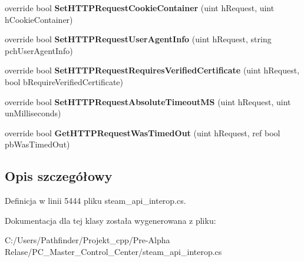 \begin{DoxyCompactItemize}
\item 
\mbox{\label{class_valve_1_1_steamworks_1_1_c_steam_h_t_t_p_a17b284d9d9ed0e9ca184bbb78473efb1}} 
override bool {\bfseries Set\+H\+T\+T\+P\+Request\+Cookie\+Container} (uint h\+Request, uint h\+Cookie\+Container)
\item 
\mbox{\label{class_valve_1_1_steamworks_1_1_c_steam_h_t_t_p_a80ea877351c612cd484a1f4849c3b6c1}} 
override bool {\bfseries Set\+H\+T\+T\+P\+Request\+User\+Agent\+Info} (uint h\+Request, string pch\+User\+Agent\+Info)
\item 
\mbox{\label{class_valve_1_1_steamworks_1_1_c_steam_h_t_t_p_a776da2b1217646560372df0ab123ad09}} 
override bool {\bfseries Set\+H\+T\+T\+P\+Request\+Requires\+Verified\+Certificate} (uint h\+Request, bool b\+Require\+Verified\+Certificate)
\item 
\mbox{\label{class_valve_1_1_steamworks_1_1_c_steam_h_t_t_p_a7dc9c7f410fe708f0cea7d4a5914c1aa}} 
override bool {\bfseries Set\+H\+T\+T\+P\+Request\+Absolute\+Timeout\+MS} (uint h\+Request, uint un\+Milliseconds)
\item 
\mbox{\label{class_valve_1_1_steamworks_1_1_c_steam_h_t_t_p_aa38dcc6954263b26d934d7704ccda823}} 
override bool {\bfseries Get\+H\+T\+T\+P\+Request\+Was\+Timed\+Out} (uint h\+Request, ref bool pb\+Was\+Timed\+Out)
\end{DoxyCompactItemize}


\subsection{Opis szczegółowy}


Definicja w linii 5444 pliku steam\+\_\+api\+\_\+interop.\+cs.



Dokumentacja dla tej klasy została wygenerowana z pliku\+:\begin{DoxyCompactItemize}
\item 
C\+:/\+Users/\+Pathfinder/\+Projekt\+\_\+cpp/\+Pre-\/\+Alpha Relase/\+P\+C\+\_\+\+Master\+\_\+\+Control\+\_\+\+Center/steam\+\_\+api\+\_\+interop.\+cs\end{DoxyCompactItemize}
